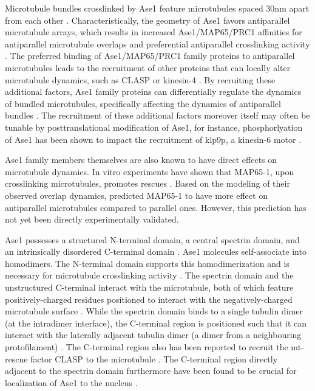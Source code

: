 Microtubule bundles crosslinked by Ase1 feature microtubules spaced 30nm apart from each other . Characteristically, the geometry of Ase1 favors antiparallel microtubule arrays, which results in increased Ase1/MAP65/PRC1 affinities for antiparallel microtubule overlaps and preferential antiparallel crosslinking activity \parencite{She2019,Bieling2010,Janson2007,Subramanian2010,Kellogg2016,Gaillard2008}. The preferred binding of Ase1/MAP65/PRC1 family proteins to antiparallel microtubules leads to the recruitment of other proteins that can locally alter microtubule dynamics, such as CLASP \parencite{Bratman2007b,Liu2009,Kitazawa2014} or kinesin-4 \parencite{Bieling2010, Mani2021}. By recruiting these additional factors, Ase1 family proteins can differentially regulate the dynamics of bundled microtubules, specifically affecting the dynamics of antiparallel bundles \parencite{Bieling2010, Bratman2007b, Thomas2020, Mani2021}. The recruitment of these additional factors moreover itself may often be tunable by posttranslational modification of Ase1, for instance, phosphorlyation of Ase1 has been shown to impact the recruitment of klp9p, a kinesin-6 motor .\par

Ase1 family members themselves are also known to have direct effects on microtubule dynamics. In vitro experiments have shown that MAP65-1, upon crosslinking microtubules, promotes rescues \parencite{Stoppin-Mellet2013}. Based on the modeling of their observed overlap dynamics, \cite{Stoppin-Mellet2013} predicted MAP65-1 to have more effect on antiparallel microtubules compared to parallel ones. However, this prediction has not yet been directly experimentally validated.\par

Ase1 possesses a structured N-terminal domain, a central spectrin domain, and an intrinsically disordered C-terminal domain \parencite{Kapitein2008,Kellogg2016}. Ase1 molecules self-associate into homodimers. The N-terminal domain supports this homodimerization and is necessary for microtubule crosslinking activity \parencite{Janson2007}. The spectrin domain and the unstructured C-terminal interact with the microtubule, both of which feature positively-charged residues positioned to interact with the negatively-charged microtubule surface \parencite{Kellogg2016}. While the spectrin domain binds to a single tubulin dimer (at the intradimer interface), the C-terminal region is positioned such that it can interact with the laterally adjacent tubulin dimer (a dimer from a neighbouring protofilament) \parencite{Kellogg2016}. The C-terminal region also has been reported to recruit the mt-rescue factor CLASP to the microtubule \cite{Bratman2007b}. The C-terminal region directly adjacent to the spectrin domain furthermore have been found to be crucial for localization of Ase1 to the nucleus .\par 

